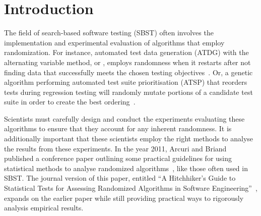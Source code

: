 
\section{Introduction}
\label{sec:introduction}

The field of search-based software testing (SBST) often involves the implementation and experimental evaluation of
algorithms that employ randomization. For instance, automated test data generation (ATDG) with the alternating variable
method, or \AVM, employs randomness when it restarts after not finding data that successfully meets the chosen
testing objectives~\cite{McMinn2015}. Or, a genetic algorithm performing automated test suite prioritisation (ATSP) that
reorders tests during regression testing will randomly mutate portions of a candidate test suite in order to
create the best ordering~\cite{Walcott2006}.

Scientists must carefully design and conduct the experiments evaluating these algorithms to ensure that they account for
any inherent randomness. It is additionally important that these scientists employ the right methods to analyse the results
from these experiments. In the year 2011, Arcuri and Briand published a conference paper outlining some practical
guidelines for using statistical methods to analyse randomized algorithms~\cite{Arcuri2011}, like those often used in
SBST. The journal version of this paper, entitled ``A Hitchhiker's Guide to Statistical Tests for
Assessing Randomized Algorithms in Software Engineering''~\cite{Arcuri2014}, expands on the earlier paper while still
providing practical ways to rigorously analysis empirical results.


